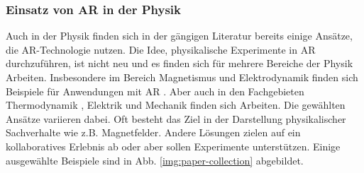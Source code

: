 \subsubsection{Einsatz von AR in der Physik}
Auch in der Physik finden sich in der gängigen Literatur bereits einige Ansätze, die AR-Technologie nutzen. Die Idee, physikalische Experimente in AR durchzuführen, ist nicht neu und es finden sich für mehrere Bereiche der Physik Arbeiten. Insbesondere im Bereich Magnetismus und Elektrodynamik finden sich Beispiele für Anwendungen mit AR \cite{Ibanez14, Matsutomo13, Mannuss11, Buchau09}. Aber auch in den Fachgebieten Thermodynamik \cite{Strzys17, Strzys18}, Elektrik \cite{Akcayir16, Amiraslanov18, Javaheri18} und Mechanik \cite{Li11, Jerry10, Kaufmann08} finden sich Arbeiten. Die gewählten Ansätze variieren dabei. Oft besteht das Ziel in der Darstellung physikalischer Sachverhalte wie z.B. Magnetfelder. Andere Lösungen zielen auf ein kollaboratives Erlebnis ab oder aber sollen Experimente unterstützen. Einige ausgewählte Beispiele sind in Abb. \ref{img:paper-collection} abgebildet. 

